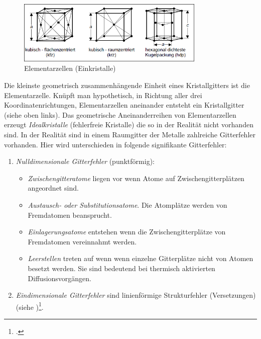 \documentclass[12pt,a4paper,parskip]{scrartcl}
\begin{document}
{\begin{itemize}
\begin{figure}
\centering
\includegraphics[width=0.8\textwidth]{elementarzellen}
\caption{Elementarzellen (Einkristalle)}
\label{fig:elementarzellen}
\end{figure}

\end{itemize}
Die kleinste geometrisch zusammenhängende Einheit eines Kristallgitters ist die Elementarzelle. Knüpft man hypothetisch, in Richtung aller drei Koordinatenrichtungen, Elementarzellen aneinander entsteht ein Kristallgitter (siehe  oben links). Das geometrische Aneinanderreihen von Elementarzellen erzeugt \emph{Idealkristalle} (fehlerfreie Kristalle) die so in der Realität nicht vorhanden sind. In der Realität sind in einem Raumgitter der Metalle zahlreiche Gitterfehler vorhanden. Hier wird unterschieden in folgende signifikante Gitterfehler:
\begin{enumerate}
\item  \emph{Nulldimensionale Gitterfehler} (punktförmig):\begin{itemize}
\item \emph{Zwischengitteratome} liegen vor wenn Atome auf Zwischengitterplätzen angeordnet sind. 
\item \emph{Austausch- oder Substitutionsatome}. Die Atomplätze werden von Fremdatomen beansprucht.
\item \emph{Einlagerungsatome} entstehen wenn die Zwischengitterplätze von Fremdatomen vereinnahmt werden.
\item \emph{Leerstellen} treten auf wenn wenn einzelne Gitterplätze nicht von Atomen besetzt werden. Sie sind bedeutend bei thermisch aktivierten Diffusionsvorgängen.
\end{itemize}
\item \emph{Eindimensionale Gitterfehler} sind linienförmige Strukturfehler (Versetzungen)(siehe )\footcite[Vgl.][50]{wk}.


\end{enumerate}}
\end{document}
